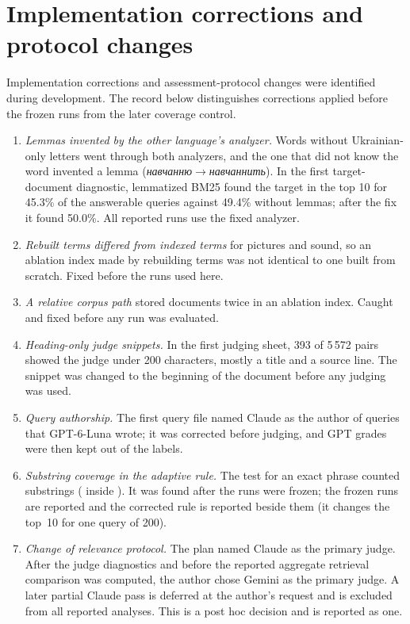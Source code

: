 \section{Implementation corrections and protocol changes}\label{sec:intro-history}
Implementation corrections and assessment-protocol changes were identified during development. The record below distinguishes corrections applied before the frozen runs from the later coverage control.
\begin{enumerate}
\item \emph{Lemmas invented by the other language's analyzer.} Words without Ukrainian-only letters went through both analyzers, and the one that did not know the word invented a lemma (\emph{навчанню}$\to$\emph{навчаннить}). In the first target-document diagnostic, lemmatized BM25 found the target in the top 10 for 45.3\% of the answerable queries against 49.4\% without lemmas; after the fix it found 50.0\%. All reported runs use the fixed analyzer.
\item \emph{Rebuilt terms differed from indexed terms} for pictures and sound, so an ablation index made by rebuilding terms was not identical to one built from scratch. Fixed before the runs used here.
\item \emph{A relative corpus path} stored documents twice in an ablation index. Caught and fixed before any run was evaluated.
\item \emph{Heading-only judge snippets.} In the first judging sheet, 393 of 5\,572 pairs showed the judge under 200 characters, mostly a title and a source line. The snippet was changed to the beginning of the document before any judging was used.
\item \emph{Query authorship.} The first query file named Claude as the author of queries that GPT-6-Luna wrote; it was corrected before judging, and GPT grades were then kept out of the labels.
\item \emph{Substring coverage in the adaptive rule.} The test for an exact phrase counted substrings ( inside ). It was found after the runs were frozen; the frozen runs are reported and the corrected rule is reported beside them (it changes the top~10 for one query of 200).
\item \emph{Change of relevance protocol.} The plan named Claude as the primary judge. After the judge diagnostics and before the reported aggregate retrieval comparison was computed, the author chose Gemini as the primary judge. A later partial Claude pass is deferred at the author's request and is excluded from all reported analyses. This is a post hoc decision and is reported as one.
\end{enumerate}
